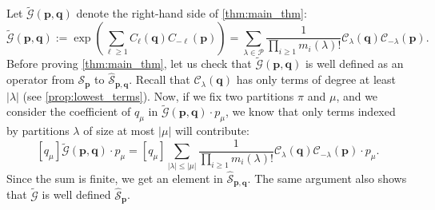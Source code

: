 \documentclass[12pt]{amsart}
\theoremstyle{remark}
\newcommand{\bfp}{\boldsymbol{p}}
\newcommand{\bfq}{\boldsymbol{q}}
\newcommand{\tG}{\widetilde{\mathcal G}}
\newcommand{\C}{\mathcal C}
\newcommand{\YY}{\mathcal{P}}
\newcommand{\mcS}{\mathcal{S}}
\newcommand{\mcSh}{\widehat{\mathcal{S}}}
\begin{document}
    Let $\tG(\bfp,\bfq)$ denote the right-hand side of \cref{thm:main_thm}:
$$\tG(\bfp,\bfq):=\exp\left(\sum_{\ell\geq 1}C_\ell(\bfq)C_{-\ell}(\bfp)\right)=\sum_{\lambda\in\YY}\frac{1}{\prod_{i\geq 1}m_i(\lambda)!}\C_\lambda(\bfq)\C_{-\lambda}(\bfp).$$
Before proving \cref{thm:main_thm}, let us check that $\tG(\bfp,\bfq)$ is well defined as an operator from $\mcS_{\bfp}$ to $\mcSh_{\bfp,\bfq}$. Recall that $\C_\lambda(\bfq)$ has only terms of degree at least $|\lambda|$ (see \cref{prop:lowest_terms}). Now, if we fix two partitions $\pi$ and $\mu$, and we consider the coefficient of $q_\mu$ in $\tG(\bfp,\bfq)\cdot p_\mu$, we know that only terms indexed by partitions $\lambda$ of size at most $|\mu|$ will contribute:
$$[q_\mu]\tG(\bfp,\bfq)\cdot p_\mu=[q_\mu]\sum_{|\lambda|\leq |\mu|}\frac{1}{\prod_{i\geq 1}m_i(\lambda)!}\C_\lambda(\bfq)\C_{-\lambda}(\bfp)\cdot p_\mu.$$
Since the sum is finite, we get an element in $\mcSh_{\bfp,\bfq}$. The same argument also shows that $\tG$ is well defined $\mcSh_{\bfp}$.
\end{document}
